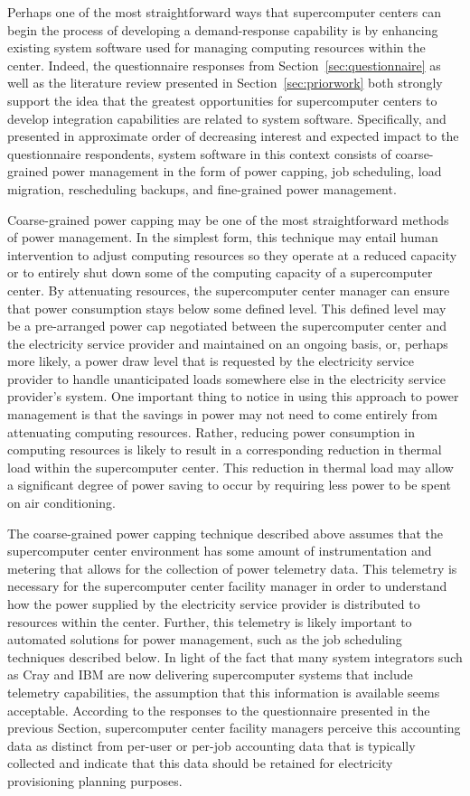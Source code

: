 Perhaps one of the most straightforward ways that supercomputer
centers can begin the process of developing a demand-response
capability is by enhancing existing system software used for managing
computing resources within the center.  Indeed, the questionnaire
responses from Section~\ref{sec:questionnaire} as well as the literature
review presented in Section~\ref{sec:priorwork} both strongly support the
idea that the greatest opportunities for supercomputer centers to
develop integration capabilities are related to system software.
Specifically, and presented in approximate order of decreasing
interest and expected impact to the questionnaire respondents, system
software in this context consists of coarse-grained power management
in the form of power capping, job scheduling, load migration,
rescheduling backups, and fine-grained power management.

Coarse-grained power capping may be one of the most straightforward
methods of power management.  In the simplest form, this technique may
entail human intervention to adjust computing resources so they
operate at a reduced capacity or to entirely shut down some of the
computing capacity of a supercomputer center.  By attenuating
resources, the supercomputer center manager can ensure that power
consumption stays below some defined level.  This defined level may be
a pre-arranged power cap negotiated between the supercomputer center
and the electricity service provider and maintained on an ongoing basis,
or, perhaps more likely, a power draw level that is requested by the
electricity service provider to handle unanticipated loads somewhere else
in the electricity service provider's system.  One important thing to
notice in using this approach to power management is that the savings
in power may not need to come entirely from attenuating computing
resources.  Rather, reducing power consumption in computing resources
is likely to result in a corresponding reduction in thermal load
within the supercomputer center.  This reduction in thermal load
may allow a significant degree of power saving to occur by requiring
less power to be spent on air conditioning.

The coarse-grained power capping technique described above assumes
that the supercomputer center environment has some amount of
instrumentation and metering that allows for the collection of power
telemetry data.  This telemetry is necessary for the supercomputer
center facility manager in order to understand how the power supplied
by the electricity service provider is distributed to resources within the
center.  Further, this telemetry is likely important to automated
solutions for power management, such as the job scheduling techniques
described below.  In light of the fact that many system integrators
such as Cray and IBM are now delivering supercomputer systems that
include telemetry capabilities, the assumption that this information
is available seems acceptable.  According to the responses to the
questionnaire presented in the previous Section, supercomputer center
facility managers perceive this accounting data as distinct from
per-user or per-job accounting data that is typically collected and
indicate that this data should be retained for electricity
provisioning planning purposes.

